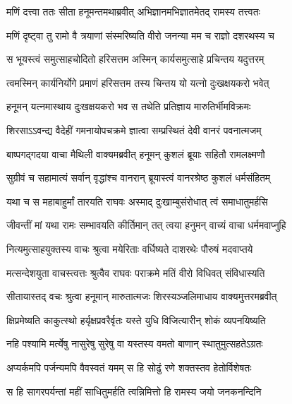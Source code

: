 
\twolineshloka
{मणिं दत्त्वा ततः सीता हनूमन्तमथाब्रवीत्}
{अभिज्ञानमभिज्ञातमेतद् रामस्य तत्त्वतः} %

\twolineshloka
{मणिं दृष्ट्वा तु रामो वै त्रयाणां संस्मरिष्यति}
{वीरो जनन्या मम च राज्ञो दशरथस्य च} %

\twolineshloka
{स भूयस्त्वं समुत्साहचोदितो हरिसत्तम}
{अस्मिन् कार्यसमुत्साहे प्रचिन्तय यदुत्तरम्} %

\twolineshloka
{त्वमस्मिन् कार्यनिर्योगे प्रमाणं हरिसत्तम}
{तस्य चिन्तय यो यत्नो दुःखक्षयकरो भवेत्} %

\twolineshloka
{हनूमन् यत्नमास्थाय दुःखक्षयकरो भव}
{स तथेति प्रतिज्ञाय मारुतिर्भीमविक्रमः} %

\twolineshloka
{शिरसाऽऽवन्द्य वैदेहीं गमनायोपचक्रमे}
{ज्ञात्वा सम्प्रस्थितं देवी वानरं पवनात्मजम्} %

\twolineshloka
{बाष्पगद्गदया वाचा मैथिली वाक्यमब्रवीत्}
{हनूमन् कुशलं ब्रूयाः सहितौ रामलक्ष्मणौ} %

\twolineshloka
{सुग्रीवं च सहामात्यं सर्वान् वृद्धांश्च वानरान्}
{ब्रूयास्त्वं वानरश्रेष्ठ कुशलं धर्मसंहितम्} %

\twolineshloka
{यथा च स महाबाहुर्मां तारयति राघवः}
{अस्माद् दुःखाम्बुसंरोधात् त्वं समाधातुमर्हसि} %

\twolineshloka
{जीवन्तीं मां यथा रामः सम्भावयति कीर्तिमान्}
{तत् त्वया हनुमन् वाच्यं वाचा धर्ममवाप्नुहि} %

\twolineshloka
{नित्यमुत्साहयुक्तस्य वाचः श्रुत्वा मयेरिताः}
{वर्धिष्यते दाशरथेः पौरुषं मदवाप्तये} %

\twolineshloka
{मत्सन्देशयुता वाचस्त्वत्तः श्रुत्वैव राघवः}
{पराक्रमे मतिं वीरो विधिवत् संविधास्यति} %

\twolineshloka
{सीतायास्तद् वचः श्रुत्वा हनूमान् मारुतात्मजः}
{शिरस्यञ्जलिमाधाय वाक्यमुत्तरमब्रवीत्} %

\twolineshloka
{क्षिप्रमेष्यति काकुत्स्थो हर्यृक्षप्रवरैर्वृतः}
{यस्ते युधि विजित्यारीन् शोकं व्यपनयिष्यति} %

\twolineshloka
{नहि पश्यामि मर्त्येषु नासुरेषु सुरेषु वा}
{यस्तस्य वमतो बाणान् स्थातुमुत्सहतेऽग्रतः} %

\twolineshloka
{अप्यर्कमपि पर्जन्यमपि वैवस्वतं यमम्}
{स हि सोढुं रणे शक्तस्तव हेतोर्विशेषतः} %

\twolineshloka
{स हि सागरपर्यन्तां महीं साधितुमर्हति}
{त्वन्निमित्तो हि रामस्य जयो जनकनन्दिनि} %

